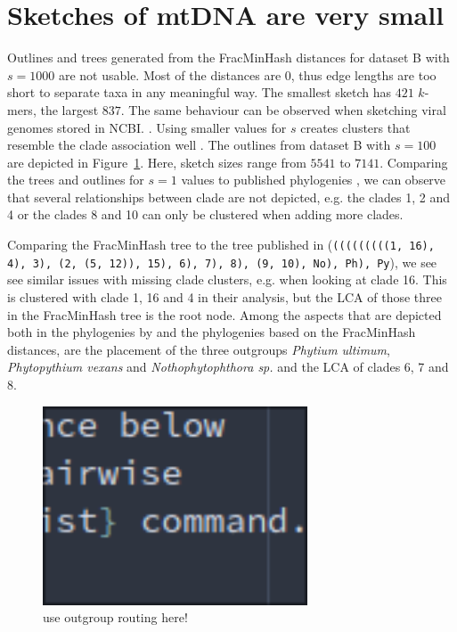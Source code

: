 \section{Sketches of mtDNA are very small}
Outlines and trees generated from the FracMinHash distances for dataset B with
$s=1000$ are not usable. Most of the distances are 0, thus edge lengths are too
short to separate taxa in any meaningful way. The smallest sketch has $421$
$k$-mers, the largest $837$. The same behaviour can be observed when sketching
viral genomes stored in NCBI. . Using smaller values for $s$ creates clusters that resemble the
clade association well
\cite{abadPhytophthoraTaxonomicPhylogenetic2023a,yangExpandedPhylogenyGenus2017}.
The outlines from dataset B with $s=100$ are depicted in
Figure~\ref{fig:winkworthOutline}. Here, sketch sizes range from $5541$ to
$7141$. Comparing the trees and outlines for $s=1$ values to published
phylogenies
\cite{abadPhytophthoraTaxonomicPhylogenetic2023a,yangExpandedPhylogenyGenus2017},
we can observe that several relationships between clade are not depicted, e.g.
the clades 1, 2 and 4 or the clades 8 and 10 can only be clustered when adding
more clades.

Comparing the FracMinHash tree to the tree published in
\cite{winkworthComparativeAnalysesComplete2022} (\texttt{(((((((((1, 16), 4),
3), (2, (5, 12)), 15), 6), 7), 8), (9, 10), No), Ph), Py}), we see see similar
issues with missing clade clusters, e.g. when looking at clade 16. This is
clustered with clade 1, 16 and 4 in their analysis, but the LCA of those three
in the FracMinHash tree is the root node. Among the aspects that are depicted
both in the phylogenies by \cite{winkworthComparativeAnalysesComplete2022} and
the phylogenies based on the FracMinHash distances, are the placement of the
three outgroups \textit{Phytium ultimum}, \textit{Phytopythium vexans} and
\textit{Nothophytophthora sp.} and the LCA of clades 6, 7 and 8.



\begin{figure}
  \centering
  \includegraphics[width=0.7\textwidth]{figures/image.png}
  \caption{use outgroup routing here!}
  \label{fig:winkworthOutline}
\end{figure}

